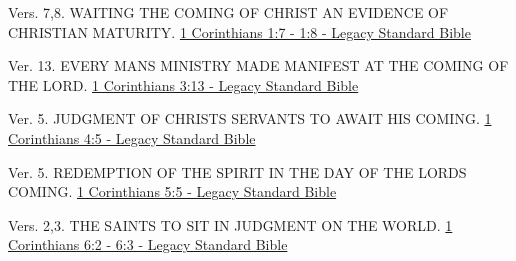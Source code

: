 \documentclass[
  ignorenonframetext,
]{beamer}
\begin{document}
\begin{frame}{1}
\label{section-197}
\begin{block}{Vers. 7,8. WAITING THE COMING OF CHRIST AN EVIDENCE OF
CHRISTIAN MATURITY.}
\label{vers.-78.-waiting-the-coming-of-christ-an-evidence-of-christian-maturity.}
\href{https://read.lsbible.org/?q=1cor1\%3A7-8}{1 Corinthians 1:7 - 1:8
- Legacy Standard Bible}
\end{block}
\end{frame}

\begin{frame}{3}
\label{section-198}
\begin{block}{Ver. 13. EVERY MAN\textquotesingle S MINISTRY MADE
MANIFEST AT THE COMING OF THE LORD.}
\label{ver.-13.-every-mans-ministry-made-manifest-at-the-coming-of-the-lord.}
\href{https://read.lsbible.org/?q=1cor3\%3A13}{1 Corinthians 3:13 -
Legacy Standard Bible}
\end{block}
\end{frame}

\begin{frame}{4}
\label{section-199}
\begin{block}{Ver. 5. JUDGMENT OF CHRIST\textquotesingle S SERVANTS TO
AWAIT HIS COMING.}
\label{ver.-5.-judgment-of-christs-servants-to-await-his-coming.}
\href{https://read.lsbible.org/?q=1cor4\%3A5}{1 Corinthians 4:5 - Legacy
Standard Bible}
\end{block}
\end{frame}

\begin{frame}{5}
\label{section-200}
\begin{block}{Ver. 5. REDEMPTION OF THE SPIRIT IN THE DAY OF THE
LORD\textquotesingle S COMING.}
\label{ver.-5.-redemption-of-the-spirit-in-the-day-of-the-lords-coming.}
\href{https://read.lsbible.org/?q=1cor5\%3A5}{1 Corinthians 5:5 - Legacy
Standard Bible}
\end{block}
\end{frame}

\begin{frame}{6}
\label{section-201}
\begin{block}{Vers. 2,3. THE SAINTS TO SIT IN JUDGMENT ON THE WORLD.}
\label{vers.-23.-the-saints-to-sit-in-judgment-on-the-world.}
\href{https://read.lsbible.org/?q=1cor6\%3A2-3}{1 Corinthians 6:2 - 6:3
- Legacy Standard Bible}
\end{block}
\end{frame}
\end{document}
